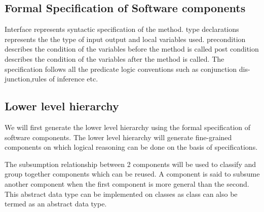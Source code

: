 \documentclass[12pt]{article}
\begin{document}
\subsection{Formal Specification of Software components}
Interface represents syntactic specification of the method.
type declarations represents the the type of input output and local variables used.
precondition describes the condition of the variables before the method is called
post condition describes the condition of the variables after the method is called.
The specification follows all the predicate logic conventions such as conjunction dis-junction,rules of inference etc.

\subsection{Lower level hierarchy}
We will first generate the lower level hierarchy using the formal specification of software components.
The lower level hierarchy will generate fine-grained components on which logical reasoning can be done on the basis of specifications.

The subsumption relationship between 2 components will be used to classify and group together components which can be reused.
A component is said to subsume another component when the first component is more general than the second.
This abstract data type can be implemented on classes as class can also be termed as an abstract data type.
\end{document}
